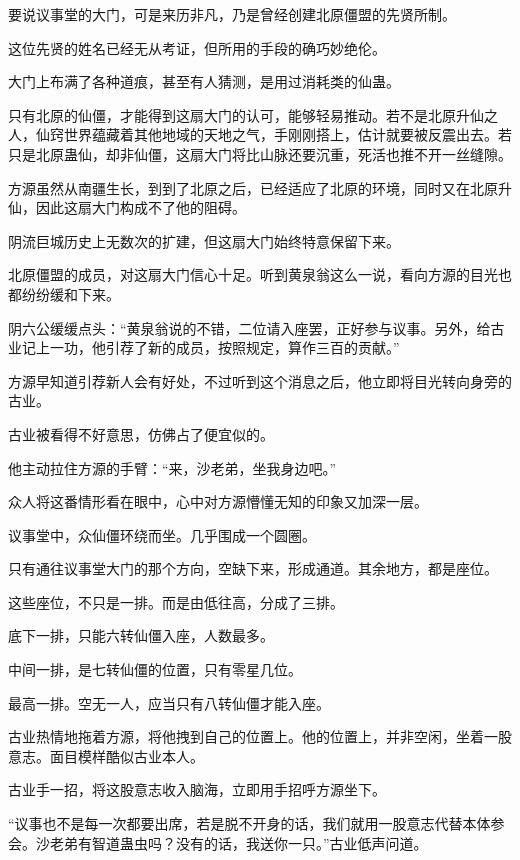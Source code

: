 
\begin{this_body}



要说议事堂的大门，可是来历非凡，乃是曾经创建北原僵盟的先贤所制。

这位先贤的姓名已经无从考证，但所用的手段的确巧妙绝伦。

大门上布满了各种道痕，甚至有人猜测，是用过消耗类的仙蛊。

只有北原的仙僵，才能得到这扇大门的认可，能够轻易推动。若不是北原升仙之人，仙窍世界蕴藏着其他地域的天地之气，手刚刚搭上，估计就要被反震出去。若只是北原蛊仙，却非仙僵，这扇大门将比山脉还要沉重，死活也推不开一丝缝隙。

方源虽然从南疆生长，到到了北原之后，已经适应了北原的环境，同时又在北原升仙，因此这扇大门构成不了他的阻碍。

阴流巨城历史上无数次的扩建，但这扇大门始终特意保留下来。

北原僵盟的成员，对这扇大门信心十足。听到黄泉翁这么一说，看向方源的目光也都纷纷缓和下来。

阴六公缓缓点头：“黄泉翁说的不错，二位请入座罢，正好参与议事。另外，给古业记上一功，他引荐了新的成员，按照规定，算作三百的贡献。”

方源早知道引荐新人会有好处，不过听到这个消息之后，他立即将目光转向身旁的古业。

古业被看得不好意思，仿佛占了便宜似的。

他主动拉住方源的手臂：“来，沙老弟，坐我身边吧。”

众人将这番情形看在眼中，心中对方源懵懂无知的印象又加深一层。

议事堂中，众仙僵环绕而坐。几乎围成一个圆圈。

只有通往议事堂大门的那个方向，空缺下来，形成通道。其余地方，都是座位。

这些座位，不只是一排。而是由低往高，分成了三排。

底下一排，只能六转仙僵入座，人数最多。

中间一排，是七转仙僵的位置，只有零星几位。

最高一排。空无一人，应当只有八转仙僵才能入座。

古业热情地拖着方源，将他拽到自己的位置上。他的位置上，并非空闲，坐着一股意志。面目模样酷似古业本人。

古业手一招，将这股意志收入脑海，立即用手招呼方源坐下。

“议事也不是每一次都要出席，若是脱不开身的话，我们就用一股意志代替本体参会。沙老弟有智道蛊虫吗？没有的话，我送你一只。”古业低声问道。


\end{this_body}
